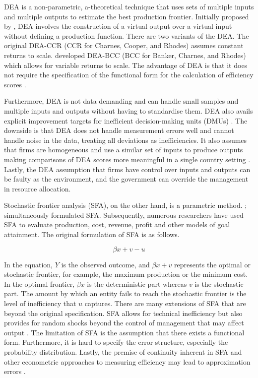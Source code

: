 \documentclass[a4paper, nobind]{templates/ociamthesis}
\begin{document}
DEA is a non-parametric, a-theoretical technique that uses sets of multiple inputs and multiple outputs to estimate the best production frontier. Initially proposed by \textcite{charnes1978measuring}, DEA involves the construction of a virtual output over a virtual input without defining a production function. There are two variants of the DEA. The original DEA-CCR (CCR for Charnes, Cooper, and Rhodes) assumes constant returns to scale. \textcite{banker1984some} developed DEA-BCC (BCC for Banker, Charnes, and Rhodes) which allows for variable returns to scale. The advantage of DEA is that it does not require the specification of the functional form for the calculation of efficiency scores \autocite{cook2014data}.

Furthermore, DEA is not data demanding and can handle small samples and multiple inputs and outputs without having to standardise them. DEA also avails explicit improvement targets for inefficient decision-making units (DMUs) \autocite{paradi2017data}. The downside is that DEA does not handle measurement errors well and cannot handle noise in the data, treating all deviations as inefficiencies. It also assumes that firms are homogeneous and use a similar set of inputs to produce outputs making comparisons of DEA scores more meaningful in a single country setting \autocite{lebovics2016financial}. Lastly, the DEA assumption that firms have control over inputs and outputs can be faulty as the environment, and the government can override the management in resource allocation.

Stochastic frontier analysis (SFA), on the other hand, is a parametric method. \textcite{aigner1977formulation}; \textcite{meeusen1977technical} simultaneously formulated SFA. Subsequently, numerous researchers have used SFA to evaluate production, cost, revenue, profit and other models of goal attainment. The original formulation of SFA is as follows.

\begin{equation}
\beta{x} + v - u
\end{equation}

In the equation, \(Y\) is the observed outcome, and \(\beta{x} + v\) represents the optimal or stochastic frontier, for example, the maximum production or the minimum cost. In the optimal frontier, \(\beta{x}\) is the deterministic part whereas \(v\) is the stochastic part. The amount by which an entity fails to reach the stochastic frontier is the level of inefficiency that \(u\) captures. There are many extensions of SFA that are beyond the original specification. SFA allows for technical inefficiency but also provides for random shocks beyond the control of management that may affect output \textcite{kumbhakar2015practitioner}. The limitation of SFA is the assumption that there exists a functional form. Furthermore, it is hard to specify the error structure, especially the probability distribution. Lastly, the premise of continuity inherent in SFA and other econometric approaches to measuring efficiency may lead to approximation errors \autocite{cullinane2006technical}.
\end{document}
